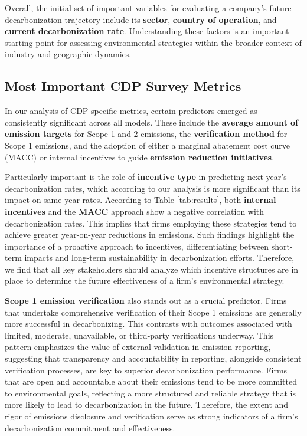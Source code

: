 Overall, the initial set of important variables for evaluating a company's future decarbonization trajectory include its \textbf{sector}, \textbf{country of operation}, and \textbf{current decarbonization rate}. Understanding these factors is an important starting point for assessing environmental strategies within the broader context of industry and geographic dynamics.

\subsection{Most Important CDP Survey Metrics}

In our analysis of CDP-specific metrics, certain predictors emerged as consistently significant across all models. These include the \textbf{average amount of emission targets} for Scope 1 and 2 emissions, the \textbf{verification method} for Scope 1 emissions, and the adoption of either a marginal abatement cost curve (MACC) or internal incentives to guide \textbf{emission reduction initiatives}.

Particularly important is the role of \textbf{incentive type} in predicting next-year's decarbonization rates, which according to our analysis is more significant than its impact on same-year rates. According to Table \ref{tab:results}, both \textbf{internal incentives} and the \textbf{MACC} approach show a negative correlation with decarbonization rates. This implies that firms employing these strategies tend to achieve greater year-on-year reductions in emissions. Such findings highlight the importance of a proactive approach to incentives, differentiating between short-term impacts and long-term sustainability in decarbonization efforts. Therefore, we find that all key stakeholders should analyze which incentive structures are in place to determine the future effectiveness of a firm's environmental strategy.

\textbf{Scope 1 emission verification} also stands out as a crucial predictor. Firms that undertake comprehensive verification of their Scope 1 emissions are generally more successful in decarbonizing. This contrasts with outcomes associated with limited, moderate, unavailable, or third-party verifications underway. This pattern emphasizes the value of external validation in emission reporting, suggesting that transparency and accountability in reporting, alongside consistent verification processes, are key to superior decarbonization performance. Firms that are open and accountable about their emissions tend to be more committed to environmental goals, reflecting a more structured and reliable strategy that is more likely to lead to decarbonization in the future. Therefore, the extent and rigor of emissions disclosure and verification serve as strong indicators of a firm's decarbonization commitment and effectiveness.

